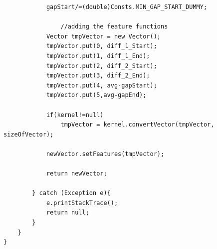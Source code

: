 \documentclass[11pt, oneside]{article}   	%
\begin{document}
\begin{lstlisting}
            gapStart/=(double)Consts.MIN_GAP_START_DUMMY;

				//adding the feature functions
            Vector tmpVector = new Vector();
            tmpVector.put(0, diff_1_Start);
            tmpVector.put(1, diff_1_End);
            tmpVector.put(2, diff_2_Start);
            tmpVector.put(3, diff_2_End);
            tmpVector.put(4, avg-gapStart);
            tmpVector.put(5,avg-gapEnd);

            if(kernel!=null)
                tmpVector = kernel.convertVector(tmpVector, sizeOfVector);

            newVector.setFeatures(tmpVector);

            return newVector;

        } catch (Exception e){
            e.printStackTrace();
            return null;
        }
	}
}
\end{lstlisting}
\end{document}
